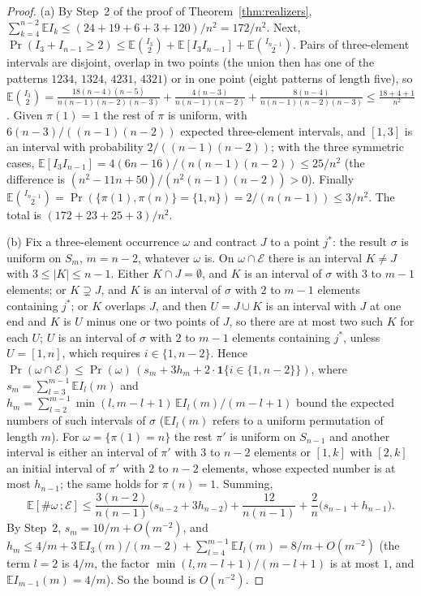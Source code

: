 \begin{proof}
(a) By Step~2 of the proof of Theorem~\ref{thm:realizers}, $\sum_{k=4}^{n-2}\mathbb EI_k\le(24+19+6+3+120)/n^2=172/n^2$. Next, $\Pr(I_3+I_{n-1}\ge2)\le\mathbb E\binom{I_3}2+\mathbb E[I_3I_{n-1}]+\mathbb E\binom{I_{n-1}}2$. Pairs of three-element intervals are disjoint, overlap in two points (the union then has one of the patterns $1234$, $1324$, $4231$, $4321$) or in one point (eight patterns of length five), so $\mathbb E\binom{I_3}2=\frac{18(n-4)(n-5)}{n(n-1)(n-2)(n-3)}+\frac{4(n-3)}{n(n-1)(n-2)}+\frac{8(n-4)}{n(n-1)(n-2)(n-3)}\le\frac{18+4+1}{n^2}$. Given $\pi(1)=1$ the rest of $\pi$ is uniform, with $6(n-3)/((n-1)(n-2))$ expected three-element intervals, and $[1,3]$ is an interval with probability $2/((n-1)(n-2))$; with the three symmetric cases, $\mathbb E[I_3I_{n-1}]=4(6n-16)/(n(n-1)(n-2))\le25/n^2$ (the difference is $(n^2-11n+50)/(n^2(n-1)(n-2))>0$). Finally $\mathbb E\binom{I_{n-1}}2=\Pr(\{\pi(1),\pi(n)\}=\{1,n\})=2/(n(n-1))\le3/n^2$. The total is $(172+23+25+3)/n^2$.

(b) Fix a three-element occurrence $\omega$ and contract $J$ to a point $j^*$: the result $\sigma$ is uniform on $S_m$, $m=n-2$, whatever $\omega$ is. On $\omega\cap\mathcal E$ there is an interval $K\ne J$ with $3\le|K|\le n-1$. Either $K\cap J=\emptyset$, and $K$ is an interval of $\sigma$ with $3$ to $m-1$ elements; or $K\supsetneq J$, and $K$ is an interval of $\sigma$ with $2$ to $m-1$ elements containing $j^*$; or $K$ overlaps $J$, and then $U=J\cup K$ is an interval with $J$ at one end and $K$ is $U$ minus one or two points of $J$, so there are at most two such $K$ for each $U$; $U$ is an interval of $\sigma$ with $2$ to $m-1$ elements containing $j^*$, unless $U=[1,n]$, which requires $i\in\{1,n-2\}$. Hence $\Pr(\omega\cap\mathcal E)\le\Pr(\omega)\,(s_m+3h_m+2\cdot\mathbf 1\{i\in\{1,n-2\}\})$, where $s_m=\sum_{l=3}^{m-1}\mathbb EI_l(m)$ and $h_m=\sum_{l=2}^{m-1}\min(l,m-l+1)\,\mathbb EI_l(m)/(m-l+1)$ bound the expected numbers of such intervals of $\sigma$ ($\mathbb EI_l(m)$ refers to a uniform permutation of length $m$). For $\omega=\{\pi(1)=n\}$ the rest $\pi'$ is uniform on $S_{n-1}$ and another interval is either an interval of $\pi'$ with $3$ to $n-2$ elements or $[1,k]$ with $[2,k]$ an initial interval of $\pi'$ with $2$ to $n-2$ elements, whose expected number is at most $h_{n-1}$; the same holds for $\pi(n)=1$. Summing,
\[
\mathbb E[\#\omega\,;\mathcal E]\le\frac{3(n-2)}{n(n-1)}\bigl(s_{n-2}+3h_{n-2}\bigr)+\frac{12}{n(n-1)}+\frac2n\bigl(s_{n-1}+h_{n-1}\bigr).
\]
By Step~2, $s_m=10/m+O(m^{-2})$, and $h_m\le4/m+3\,\mathbb EI_3(m)/(m-2)+\sum_{l=4}^{m-1}\mathbb EI_l(m)=8/m+O(m^{-2})$ (the term $l=2$ is $4/m$, the factor $\min(l,m-l+1)/(m-l+1)$ is at most $1$, and $\mathbb EI_{m-1}(m)=4/m$). So the bound is $O(n^{-2})$.
\end{proof}

